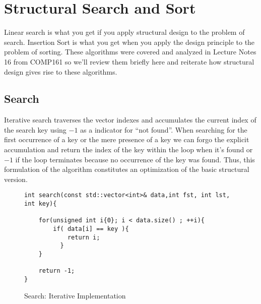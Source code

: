 \documentclass[nobib]{tufte-handout}
\begin{document}
\section{Structural Search and Sort}

Linear search is what you get if you apply structural design to the problem of search. Insertion Sort is what you get when you apply the design principle to the problem of sorting. These algorithms were covered and analyzed in Lecture Notes 16 from COMP161 so we'll review them  briefly here and reiterate how structural design gives rise to these algorithms.

\subsection{Search}

Iterative search traverses the vector indexes and accumulates the current index of the search key using $-1$ as a indicator for ``not found''. When searching for the first occurrence of a key or the mere presence of a key we can forgo the explicit accumulation and return the index of the key within the loop when it's found or $-1$ if the loop terminates because no occurrence of the key was found. Thus, this formulation of the algorithm constitutes an optimization of the basic structural version.

\begin{figure}[htpb!]
\begin{lstlisting}
int search(const std::vector<int>& data,int fst, int lst, int key){

    for(unsigned int i{0}; i < data.size() ; ++i){
    	if( data[i] == key ){
			return i;
		  }
    }

    return -1;
}
\end{lstlisting}
\label{code:searchiter}
\caption{Search: Iterative Implementation}
\end{figure}
\end{document}
